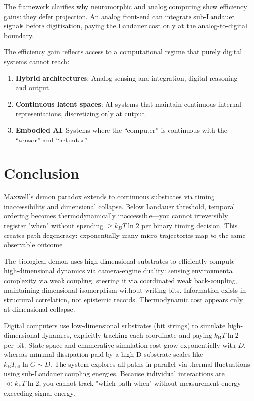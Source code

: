 \documentclass[12pt]{article}
\numberwithin{equation}{section}
\newcommand{\kB}{k_{\mathrm{B}}}
\newcommand{\Teff}{T_{\mathrm{eff}}}
\begin{document}
The framework clarifies why neuromorphic and analog computing show efficiency gains: they defer projection. An analog front-end can integrate sub-Landauer signals before digitization, paying the Landauer cost only at the analog-to-digital boundary.

The efficiency gain reflects access to a computational regime that purely digital systems cannot reach:

\begin{enumerate}
\item \textbf{Hybrid architectures}: Analog sensing and integration, digital reasoning and output
\item \textbf{Continuous latent spaces}: AI systems that maintain continuous internal representations, discretizing only at output
\item \textbf{Embodied AI}: Systems where the ``computer'' is continuous with the ``sensor'' and ``actuator''
\end{enumerate}

\section{Conclusion}

Maxwell's demon paradox extends to continuous substrates via timing inaccessibility and dimensional collapse. Below Landauer threshold, temporal ordering becomes thermodynamically inaccessible—you cannot irreversibly register "when" without spending $\geq k_BT\ln 2$ per binary timing decision. This creates path degeneracy: exponentially many micro-trajectories map to the same observable outcome.

The biological demon uses high-dimensional substrates to efficiently compute high-dimensional dynamics via camera-engine duality: sensing environmental complexity via weak coupling, steering it via coordinated weak back-coupling, maintaining dimensional isomorphism without writing bits. Information exists in structural correlation, not epistemic records. Thermodynamic cost appears only at dimensional collapse.

Digital computers use low-dimensional substrates (bit strings) to simulate high-dimensional dynamics, explicitly tracking each coordinate and paying $\kB T\ln 2$ per bit. State-space and enumerative simulation cost grow exponentially with $D$, whereas minimal dissipation paid by a high-D substrate scales like $\kB\Teff\ln G \sim D$. The system explores all paths in parallel via thermal fluctuations using sub-Landauer coupling energies. Because individual interactions are $\ll \kB T\ln 2$, you cannot track "which path when" without measurement energy exceeding signal energy.
\end{document}
